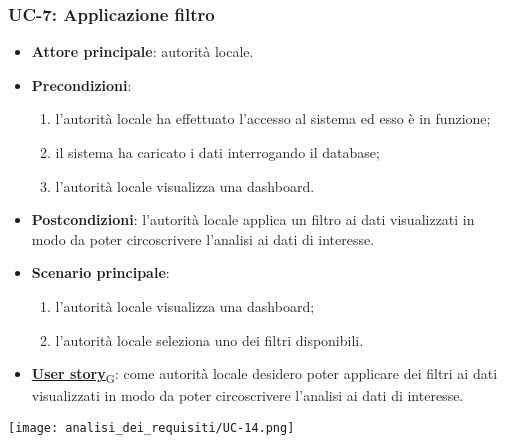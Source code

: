 \subsubsection{UC-7: Applicazione filtro}
\begin{itemize}
	\item \textbf{Attore principale}: autorità locale.
	\item \textbf{Precondizioni}:
	      \begin{enumerate}
		      \item l'autorità locale ha effettuato l'accesso al sistema ed esso è in funzione;
		      \item il sistema ha caricato i dati interrogando il database;
		      \item l'autorità locale visualizza una dashboard.
	      \end{enumerate}
	\item \textbf{Postcondizioni}: l'autorità locale applica un filtro ai dati visualizzati in modo da poter circoscrivere l'analisi ai dati di interesse.
	\item \textbf{Scenario principale}:
	      \begin{enumerate}
		      \item l'autorità locale visualizza una dashboard;
		      \item l'autorità locale seleziona uno dei filtri disponibili.
	      \end{enumerate}
	\item \href{https://7last.github.io/docs/rtb/documentazione-interna/glossario\#user-story}{\textbf{User story}\textsubscript{G}}:
	      come autorità locale desidero poter applicare dei filtri ai dati visualizzati in modo da poter circoscrivere l'analisi ai dati di interesse.
\end{itemize}
\begin{center}
	\texttt{[image: analisi\_dei\_requisiti/UC-14.png]}
\end{center}

